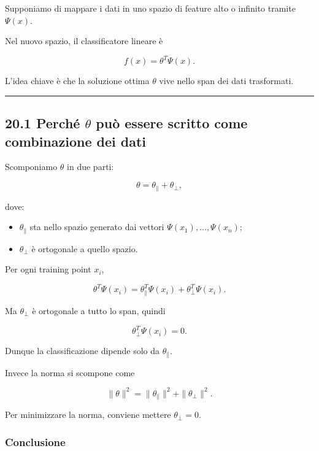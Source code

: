 \documentclass{article}
\providecommand{\tightlist}{%
  \setlength{\itemsep}{0pt}\setlength{\parskip}{0pt}}
\begin{document}
Supponiamo di mappare i dati in uno spazio di feature alto o infinito
tramite \(\Psi(x)\).

Nel nuovo spazio, il classificatore lineare è

\[
f(x)=\theta^T\Psi(x).
\]

L'idea chiave è che la soluzione ottima \(\theta\) vive nello span dei
dati trasformati.

\begin{center}\rule{0.5\linewidth}{0.5pt}\end{center}

\subsection{\texorpdfstring{20.1 Perché \(\theta\) può essere scritto
come combinazione dei
dati}{20.1 Perché \textbackslash theta può essere scritto come combinazione dei dati}}\label{perchuxe9-theta-puuxf2-essere-scritto-come-combinazione-dei-dati}

Scomponiamo \(\theta\) in due parti:

\[
\theta = \theta_{\parallel} + \theta_{\perp},
\]

dove:

\begin{itemize}
\tightlist
\item
  \(\theta_{\parallel}\) sta nello spazio generato dai vettori
  \(\Psi(x_1),\dots,\Psi(x_n)\);
\item
  \(\theta_{\perp}\) è ortogonale a quello spazio.
\end{itemize}

Per ogni training point \(x_i\),

\[
\theta^T\Psi(x_i)
=
\theta_{\parallel}^T\Psi(x_i) + \theta_{\perp}^T\Psi(x_i).
\]

Ma \(\theta_{\perp}\) è ortogonale a tutto lo span, quindi

\[
\theta_{\perp}^T\Psi(x_i)=0.
\]

Dunque la classificazione dipende solo da \(\theta_{\parallel}\).

Invece la norma si scompone come

\[
\|\theta\|^2 = \|\theta_{\parallel}\|^2 + \|\theta_{\perp}\|^2.
\]

Per minimizzare la norma, conviene mettere \(\theta_{\perp}=0\).

\subsubsection{Conclusione}\label{conclusione-9}
\end{document}
